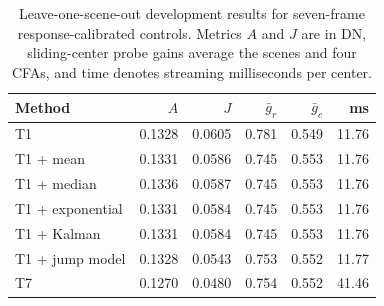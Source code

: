 \begin{table}[!t]
\centering
\caption{Leave-one-scene-out development results for seven-frame response-calibrated controls. Metrics $A$ and $J$ are in DN, sliding-center probe gains average the scenes and four CFAs, and time denotes streaming milliseconds per center.}\label{tab:filters}
\footnotesize
\setlength{\tabcolsep}{2.6pt}
\begin{tabular}{lrrrrr}
\toprule
Method & $A$ & $J$ & $\bar g_r$ & $\bar g_c$ & ms \\
\midrule
T1 & 0.1328 & 0.0605 & 0.781 & 0.549 & 11.76 \\
T1 + mean & 0.1331 & 0.0586 & 0.745 & 0.553 & 11.76 \\
T1 + median & 0.1336 & 0.0587 & 0.745 & 0.553 & 11.76 \\
T1 + exponential & 0.1331 & 0.0584 & 0.745 & 0.553 & 11.76 \\
T1 + Kalman & 0.1331 & 0.0584 & 0.745 & 0.553 & 11.76 \\
T1 + jump model & 0.1328 & 0.0543 & 0.753 & 0.552 & 11.77 \\
T7 & 0.1270 & 0.0480 & 0.754 & 0.552 & 41.46 \\
\bottomrule
\end{tabular}
\end{table}
